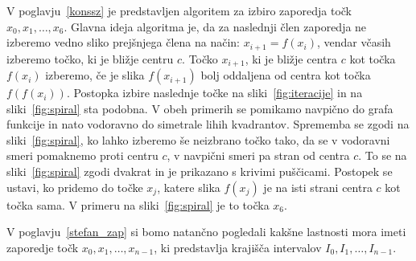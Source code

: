 \documentclass[mat2]{fmfdelo}
\begin{document}
\begin{primer}[9-cikel]
V poglavju~\ref{konssz} je predstavljen algoritem za izbiro zaporedja točk $x_0, x_1, \dots, x_6$. Glavna ideja algoritma je, da za naslednji člen zaporedja ne izberemo vedno sliko prejšnjega člena na način: $x_{i+1} = f(x_i)$, vendar včasih izberemo točko, ki je bližje centru $c$. Točko $x_{i+1}$, ki je bližje centra $c$ kot točka $f(x_i)$ izberemo, če je slika $f(x_{i+1})$ bolj oddaljena od centra kot točka $f(f(x_i))$. Postopka izbire naslednje točke na sliki~\ref{fig:iteracije} in na sliki~\ref{fig:spiral} sta podobna. V obeh primerih se pomikamo navpično do grafa funkcije in nato vodoravno do simetrale lihih kvadrantov. Sprememba se zgodi na sliki~\ref{fig:spiral}, ko lahko izberemo še neizbrano točko tako, da se v vodoravni smeri pomaknemo proti centru $c$, v navpični smeri pa stran od centra $c$. To se na sliki~\ref{fig:spiral} zgodi dvakrat in je prikazano s krivimi puščicami. 
Postopek se ustavi, ko pridemo do točke $x_j$, katere slika $f(x_j)$ je na isti strani centra $c$ kot točka sama. V primeru na sliki~\ref{fig:spiral} je to točka $x_6$.

V poglavju~\ref{stefan_zap} si bomo natančno pogledali kakšne lastnosti mora imeti zaporedje točk $x_0, x_1, \dots, x_{n-1}$, ki predstavlja krajišča intervalov $I_0, I_1, \dots, I_{n-1}$.

\end{primer}
\end{document}
